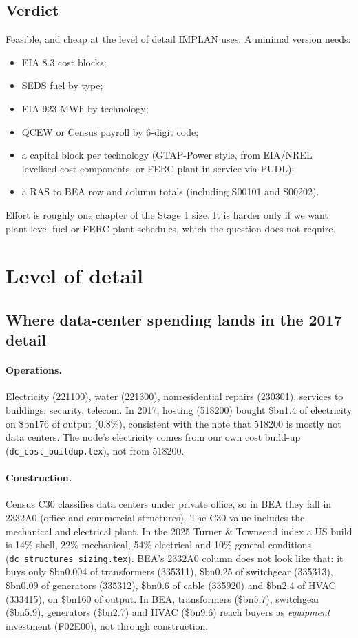 \documentclass[11pt]{article}
\newcommand{\bn}{\$bn}
\begin{document}
\subsection{Verdict}
Feasible, and cheap at the level of detail IMPLAN uses. A minimal version needs:
\begin{itemize}
  \item EIA 8.3 cost blocks;
  \item SEDS fuel by type;
  \item EIA-923 MWh by technology;
  \item QCEW or Census payroll by 6-digit code;
  \item a capital block per technology (GTAP-Power style, from EIA/NREL levelised-cost components, or FERC plant in service via PUDL);
  \item a RAS to BEA row and column totals (including S00101 and S00202).
\end{itemize}
Effort is roughly one chapter of the Stage 1 size. It is harder only if we want plant-level fuel or FERC plant schedules, which the question does not require.

\section{Level of detail}\label{sec:detail}

\subsection{Where data-center spending lands in the 2017 detail}
\paragraph{Operations.} Electricity (221100), water (221300), nonresidential repairs (230301), services to buildings, security, telecom. In 2017, hosting (518200) bought \bn1.4 of electricity on \bn176 of output (0.8\%), consistent with the note that 518200 is mostly not data centers. The node's electricity comes from our own cost build-up (\texttt{dc\_cost\_buildup.tex}), not from 518200.

\paragraph{Construction.} Census C30 classifies data centers under private office, so in BEA they fall in 2332A0 (office and commercial structures). The C30 value includes the mechanical and electrical plant. In the 2025 Turner \& Townsend index a US build is 14\% shell, 22\% mechanical, 54\% electrical and 10\% general conditions (\texttt{dc\_structures\_sizing.tex}). BEA's 2332A0 column does not look like that: it buys only \bn0.004 of transformers (335311), \bn0.25 of switchgear (335313), \bn0.09 of generators (335312), \bn0.6 of cable (335920) and \bn2.4 of HVAC (333415), on \bn160 of output. In BEA, transformers (\bn5.7), switchgear (\bn5.9), generators (\bn2.7) and HVAC (\bn9.6) reach buyers as \emph{equipment} investment (F02E00), not through construction.
\end{document}
